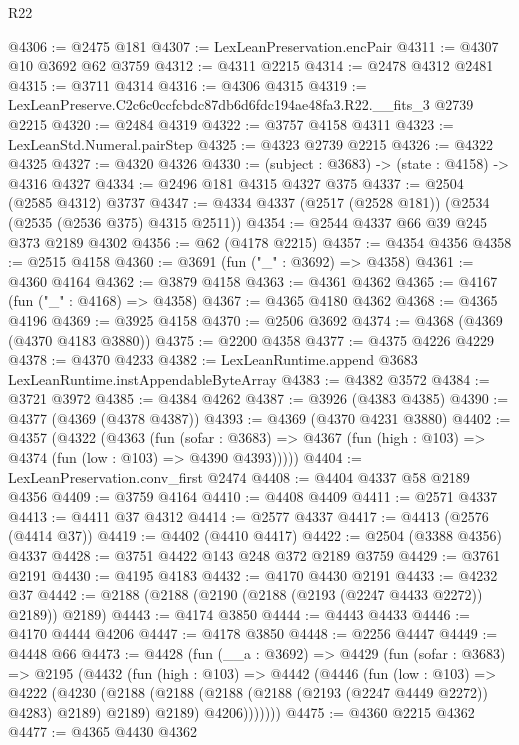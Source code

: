 \begin{lexlean}{R22}
\begin{coremodule}
@4306 := @2475 @181
@4307 := LexLeanPreservation.encPair
@4311 := @4307 @10 @3692 @62 @3759
@4312 := @4311 @2215
@4314 := @2478 @4312 @2481
@4315 := @3711 @4314
@4316 := @4306 @4315
@4319 := LexLeanPreserve.C2c6c0ccfcbdc87db6d6fdc194ae48fa3.R22.__fits_3 @2739 @2215
@4320 := @2484 @4319
@4322 := @3757 @4158 @4311
@4323 := LexLeanStd.Numeral.pairStep
@4325 := @4323 @2739 @2215
@4326 := @4322 @4325
@4327 := @4320 @4326
@4330 := (subject : @3683) -> (state : @4158) -> @4316 @4327
@4334 := @2496 @181 @4315 @4327 @375
@4337 := @2504 (@2585 @4312) @3737
@4347 := @4334 @4337 (@2517 (@2528 @181)) (@2534 (@2535 (@2536 @375) @4315 @2511))
@4354 := @2544 @4337 @66 @39 @245 @373 @2189 @4302
@4356 := @62 (@4178 @2215)
@4357 := @4354 @4356
@4358 := @2515 @4158
@4360 := @3691 (fun ("_" : @3692) => @4358)
@4361 := @4360 @4164
@4362 := @3879 @4158
@4363 := @4361 @4362
@4365 := @4167 (fun ("_" : @4168) => @4358)
@4367 := @4365 @4180 @4362
@4368 := @4365 @4196
@4369 := @3925 @4158
@4370 := @2506 @3692
@4374 := @4368 (@4369 (@4370 @4183 @3880))
@4375 := @2200 @4358
@4377 := @4375 @4226 @4229
@4378 := @4370 @4233
@4382 := LexLeanRuntime.append @3683 LexLeanRuntime.instAppendableByteArray
@4383 := @4382 @3572
@4384 := @3721 @3972
@4385 := @4384 @4262
@4387 := @3926 (@4383 @4385)
@4390 := @4377 (@4369 (@4378 @4387))
@4393 := @4369 (@4370 @4231 @3880)
@4402 := @4357
    (@4322
      (@4363
        (fun (sofar : @3683) =>
        @4367 (fun (high : @103) => @4374 (fun (low : @103) => @4390 @4393)))))
@4404 := LexLeanPreservation.conv_first @2474
@4408 := @4404 @4337 @58 @2189 @4356
@4409 := @3759 @4164
@4410 := @4408 @4409
@4411 := @2571 @4337
@4413 := @4411 @37 @4312
@4414 := @2577 @4337
@4417 := @4413 (@2576 (@4414 @37))
@4419 := @4402 (@4410 @4417)
@4422 := @2504 (@3388 @4356) @4337
@4428 := @3751 @4422 @143 @248 @372 @2189 @3759
@4429 := @3761 @2191
@4430 := @4195 @4183
@4432 := @4170 @4430 @2191
@4433 := @4232 @37
@4442 := @2188 (@2188 (@2190 (@2188 (@2193 (@2247 @4433 @2272)) @2189)) @2189)
@4443 := @4174 @3850
@4444 := @4443 @4433
@4446 := @4170 @4444 @4206
@4447 := @4178 @3850
@4448 := @2256 @4447
@4449 := @4448 @66
@4473 := @4428
    (fun (__a : @3692) =>
    @4429
      (fun (sofar : @3683) =>
      @2195
        (@4432
          (fun (high : @103) =>
          @4442
            (@4446
              (fun (low : @103) =>
              @4222
                (@4230
                  (@2188
                    (@2188 (@2188 (@2188 (@2193 (@2247 @4449 @2272)) @4283) @2189) @2189)
                    @2189)
                  @4206)))))))
@4475 := @4360 @2215 @4362
@4477 := @4365 @4430 @4362

\end{coremodule}
\end{lexlean}
